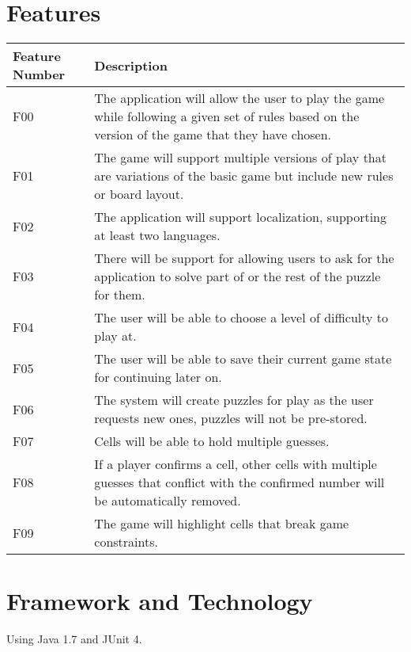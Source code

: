 \documentclass{article}
\begin{document}
\section{Features}

\begin{tabular}{ | p{1.5in} | p{4.5in} | }
\hline
\textbf{Feature Number} & \textbf{Description}\\
\hline
\hline
F00 & The application will allow the user to play the game while following a given set of rules based on the version of the game that they have chosen.\\
\hline
F01 & The game will support multiple versions of play that are variations of the basic game but include new rules or board layout.\\
\hline
F02 & The application will support localization, supporting at least two languages.\\
\hline
F03 & There will be support for allowing users to ask for the application to solve part of or the rest of the puzzle for them.\\
\hline
F04 & The user will be able to choose a level of difficulty to play at.\\
\hline
F05 & The user will be able to save their current game state for continuing later on.\\
\hline
F06 & The system will create puzzles for play as the user requests new ones, puzzles will not be pre-stored.\\
\hline
F07 & Cells will be able to hold multiple guesses.\\
\hline
F08 & If a player confirms a cell, other cells with multiple guesses that conflict with the confirmed number will be automatically removed.\\
\hline
F09 & The game will highlight cells that break game constraints.\\
\hline
\end{tabular}

\section{Framework and Technology}
Using Java 1.7 and JUnit 4.
\end{document}
